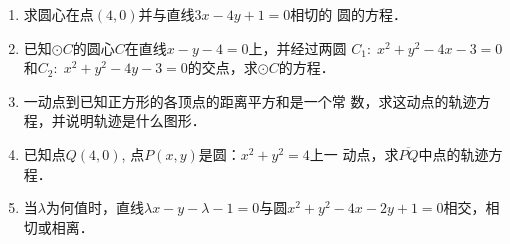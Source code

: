 \begin{enumerate}
\item 求圆心在点$(4,0)$并与直线$3x-4y+1=0$相切的
圆的方程．
\item 已知$\odot C$的圆心$C$在直线$x-y-4=0$上，并经过两圆
$C_1:\; x^2+y^2-4x-3=0$和$C_2:\; x^2+y^2-4y-3
=0$的交点，求$\odot C$的方程．
\item 一动点到已知正方形的各顶点的距离平方和是一个常
数，求这动点的轨迹方程，并说明轨迹是什么图形．
\item 已知点$Q(4,0)$, 点$P(x,y)$是圆：$x^2+y^2=4$上一
动点，求$\overline{PQ}$中点的轨迹方程．
\item 当$\lambda$为何值时，直线$\lambda x-y-\lambda-1=0$与圆$x^2+y^2-
4x-2y+1=0$相交，相切或相离．
\end{enumerate}